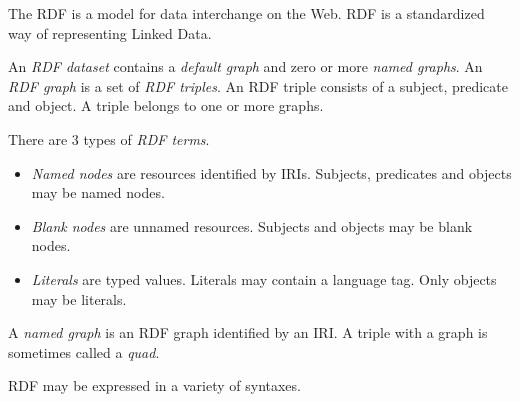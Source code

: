 \documentclass{report}
\begin{document}
The RDF is a model for data interchange on the Web.
RDF is a standardized way of representing Linked Data.

An \emph{RDF dataset} contains a \emph{default graph}
and zero or more \emph{named graphs}.
An \emph{RDF graph} is a set of \emph{RDF triples}.
An RDF triple consists of a subject, predicate and object.
A triple belongs to one or more graphs.

There are 3 types of \emph{RDF terms}.
\begin{itemize}
  \item \emph{Named nodes} are resources identified by IRIs.
        Subjects, predicates and objects may be named nodes.
  \item \emph{Blank nodes} are unnamed resources.
        Subjects and objects may be blank nodes.
  \item \emph{Literals} are typed values.
        Literals may contain a language tag.
        Only objects may be literals.
\end{itemize}

A \emph{named graph} is an RDF graph identified by an IRI.
A triple with a graph is sometimes called a \emph{quad}.

RDF may be expressed in a variety of syntaxes.

\end{document}
